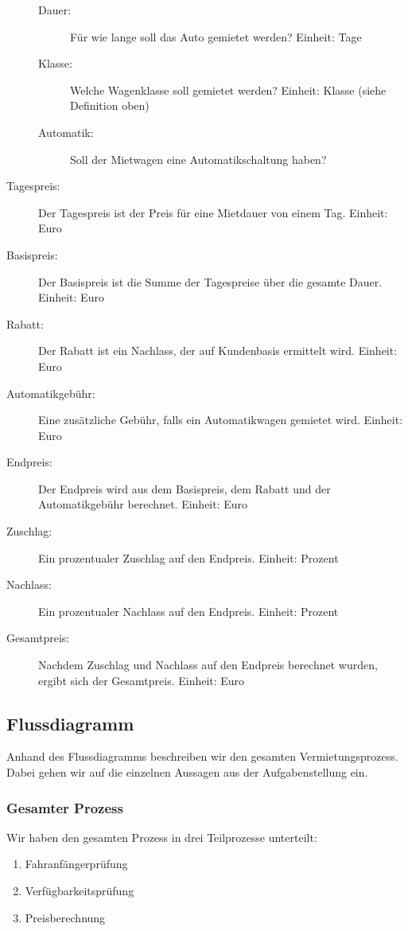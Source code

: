 \begin{description}
\begin{description}
			\item[Dauer:] Für wie lange soll das Auto gemietet werden? Einheit: Tage
			\item[Klasse:] Welche Wagenklasse soll gemietet werden? Einheit: Klasse (siehe Definition oben)
			\item[Automatik:] Soll der Mietwagen eine Automatikschaltung haben?
		\end{description}
	\item[Tagespreis:] Der Tagespreis ist der Preis für eine Mietdauer von einem Tag. Einheit: Euro
	\item[Basispreis:] Der Basispreis ist die Summe der Tagespreise über die gesamte Dauer. Einheit: Euro
	\item[Rabatt:] Der Rabatt ist ein Nachlass, der auf Kundenbasis ermittelt wird. Einheit: Euro
	\item[Automatikgebühr:] Eine zusätzliche Gebühr, falls ein Automatikwagen gemietet wird. Einheit: Euro
	\item[Endpreis:] Der Endpreis wird aus dem Basispreis, dem Rabatt und der Automatikgebühr berechnet. Einheit: Euro
	\item[Zuschlag:] Ein prozentualer Zuschlag auf den Endpreis. Einheit: Prozent
	\item[Nachlass:] Ein prozentualer Nachlass auf den Endpreis. Einheit: Prozent
	\item[Gesamtpreis:] Nachdem Zuschlag und Nachlass auf den Endpreis berechnet wurden, ergibt sich der Gesamtpreis. Einheit: Euro
	
\end{description}

\subsection{Flussdiagramm}

Anhand des Flussdiagramms beschreiben wir den gesamten Vermietungsprozess. Dabei gehen wir auf
die einzelnen Aussagen aus der Aufgabenstellung ein.

\subsubsection{Gesamter Prozess}

Wir haben den gesamten Prozess in drei Teilprozesse unterteilt:
\begin{enumerate}
	\item Fahranfängerprüfung
	\item Verfügbarkeitsprüfung
	\item Preisberechnung
\end{enumerate}

